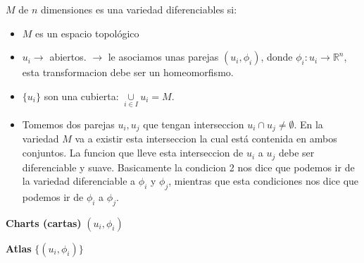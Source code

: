 \documentclass{article}
\newcommand{\caja}[3]{%
  \begin{tcolorbox}[colback=#1!5!white,colframe=#1!25!black,title=#2]
    #3
  \end{tcolorbox}%
}
\begin{document}
$ M  $ de $ n  $ dimensiones es una variedad diferenciables si: 
\begin{itemize}
  \item $ M  $ es un espacio topológico 
  \item $ u_i  \rightarrow $ abiertos. $ \rightarrow  $ le asociamos unas parejas $ (u_i,\phi_i) $, donde $ \phi_i: u_i \rightarrow \mathbb{R}^ {n } $, esta transformacion debe ser un homeomorfismo.
  \item $ \{u_i\} $ son una cubierta: $ \underset{i \in I }{\cup }u_i = M  $.
  \item Tomemos dos parejas $ u_i, u_j  $ que tengan interseccion $ u_i \cap u_j \neq \emptyset   $. En la variedad $ M  $ va a existir esta interseccion la cual está contenida en ambos conjuntos. La funcion que lleve esta interseccion de $ u_i  $ a $ u_j  $ debe ser diferenciable y suave. Basicamente la condicion 2 nos dice que podemos ir de la variedad diferenciable a $ \phi_i  $ y $ \phi_j  $, mientras que esta condiciones nos dice que podemos ir de $ \phi_i  $ a $ \phi_j  $. 
\end{itemize}
\caja{black}{}{
  \textbf{Charts (cartas)} $ (u_i,\phi_i ) $

  \textbf{Atlas } $ \{(u_i,\phi_i )\} $
}
\end{document}
